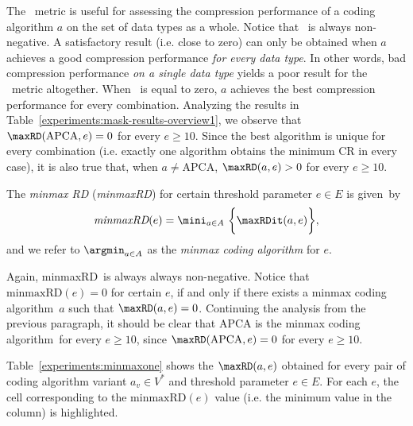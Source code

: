 The \maxRD\ metric is useful for assessing the compression performance of a coding algorithm $a$ on the set of data types as a whole. Notice that \maxRD\ is always non-negative. A satisfactory result (i.e. close to zero) can only be obtained when $a$ achieves a good compression performance \textit{for every data type}. In other words, bad compression performance \textit{on a single data type} yields a poor result for the \maxRD\ metric altogether. When \maxRD\ is equal to zero, $a$ achieves the best compression performance for every combination. Analyzing the results in Table~\ref{experiments:mask-results-overview1}, we observe that $\text{\maxRD}(\text{APCA}, e)=0$ for every $e \geq 10$. Since the best algorithm is unique for every combination (i.e. exactly one algorithm obtains the minimum CR in every case), it is also true that, when $a \neq \text{APCA}$, $\text{\maxRD}(a, e)>0$ for every $e \geq 10$.


\vspace{+10pt}
\newcommand{\minmaxRD}{minmaxRD}
\newcommand{\minmaxRDit}{\textit{minmaxRD}}
\newcommand{\minmaxca}{minmax coding algorithm}
\begin{defcion}
\label{eq:minmaxRD}
The \textit{minmax RD} (\minmaxRDit) for certain threshold parameter $e\in E$ is given~by
\vspace{-4pt}
\begin{equation}
\minmaxRDit(e) = \mini_{a \in A} \ \biggl\{ \maxRDit(a, e) \biggr\},
\end{equation}
and we refer to $\argmin_{a \in A}$ as the \textit{\minmaxca} for $e$.
\end{defcion}


\vspace{-3pt}
Again, \minmaxRD\ is always always non-negative. Notice that $\text{\minmaxRD}(e)=0$ for certain $e$, if and only if there exists a \minmaxca\ $a$ such that $\text{\maxRD}(a, e)=0$. Continuing the analysis from the previous paragraph, it should be clear that APCA is the \minmaxca\ for every $e \geq 10$, since $\text{\maxRD}(\text{APCA}, e)=0$ for every $e \geq 10$.


Table~\ref{experiments:minmaxone} shows the $\text{\maxRD}(a, e)$ obtained for every pair of coding algorithm variant $a_v \in V^*$ and threshold parameter $e \in E$. For each $e$, the cell corresponding to the $\text{\minmaxRD}(e)$ value (i.e. the minimum value in the column) is highlighted.
\vspace{+3pt}





